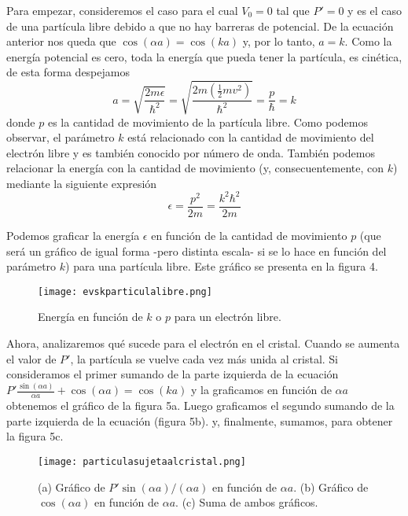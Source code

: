 \documentclass[12pt,a4paper]{article}
\begin{document}
Para empezar, consideremos el caso para el cual $V_{0}=0$ tal que $P'=0$ y es el caso de una partícula libre debido a que no hay barreras de potencial. De la ecuación anterior nos queda que $\cos(\alpha a)=\cos(k a)$ y, por lo tanto, $a=k$. Como la energía potencial es cero, toda la energía que pueda tener la partícula, es cinética, de esta forma despejamos
\[ a= \sqrt{\frac{2m\epsilon}{\hbar^{2}}} = \sqrt{\frac{2m(\frac{1}{2}mv^{2})}{\hbar^{2}}} = \frac{p}{\hbar}=k \]
donde $p$ es la cantidad de movimiento de la partícula libre. Como podemos observar, el parámetro $k$ está relacionado con la cantidad de movimiento del electrón libre y es también conocido por número de onda. También podemos relacionar la energía con la cantidad de movimiento (y, consecuentemente, con $k$) mediante la siguiente expresión
\[ \epsilon = \frac{p^{2}}{2m} = \frac{k^{2} \hbar^{2}}{2m} \]

Podemos graficar la energía $\epsilon$ en función de la cantidad de movimiento $p$ (que será un gráfico de igual forma -pero distinta escala- si se lo hace en función del parámetro $k$) para una partícula libre. Este gráfico se presenta en la figura 4.

\begin{figure}[ht!]
\begin{center}
\texttt{[image: evskparticulalibre.png]}
\caption{Energía en función de $k$ o $p$ para un electrón libre.}
\end{center}
\end{figure}

Ahora, analizaremos qué sucede para el electrón en el cristal. Cuando se aumenta el valor de $P'$, la partícula se vuelve cada vez más unida al cristal. Si consideramos el primer sumando de la parte izquierda de la ecuación $P' \frac{\sin(\alpha a)}{\alpha a} + \cos (\alpha a) = \cos(ka)$ y la graficamos en función de $\alpha a$ obtenemos el gráfico de la figura 5a. Luego graficamos el segundo sumando de la parte izquierda de la ecuación (figura 5b). y, finalmente, sumamos, para obtener la figura 5c.

\begin{figure}[ht!]
\begin{center}
\texttt{[image: particulasujetaalcristal.png]}
\caption{(a) Gráfico de $P'\sin(\alpha a)/(\alpha a)$ en función de $\alpha a$. (b) Gráfico de $\cos (\alpha a)$ en función de $\alpha a$. (c) Suma de ambos gráficos.}
\end{center}
\end{figure}
\end{document}

